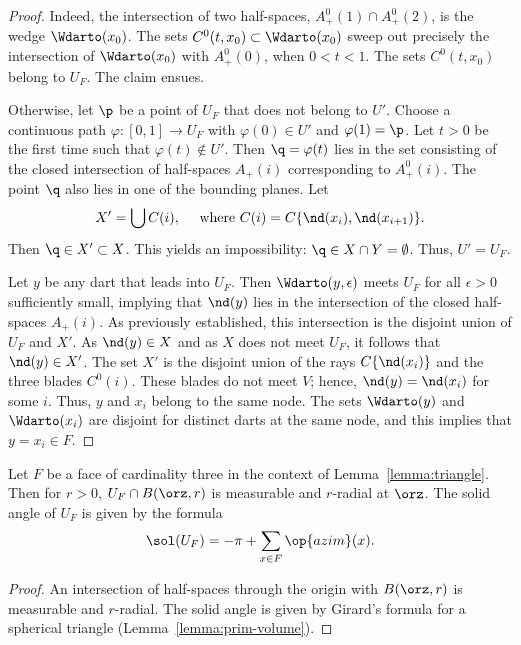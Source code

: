 \begin{proof} 
Indeed, the intersection of two half-spaces, $A^0_+(1)\cap
  A^0_+(2)$, is the wedge $\Wdarto(x_0)$.  The sets
  $C^0(t,x_0)\subset\Wdarto(x_0)$ sweep out precisely the intersection
  of $\Wdarto(x_0)$ with $A^0_+(0)$, when $0<t<1$.  The sets
  $C^0(t,x_0)$ belong to $U_F$.  The claim ensues.

   Otherwise, let
  $\p$ be a point of $U_F$ that does not belong to $U'$.  Choose a
  continuous path $\varphi:[0,1]\to U_F$ with $\varphi(0)\in U'$ and
  $\varphi(1)=\p$.  Let $t>0$ be the first time such that
  $\varphi(t)\not\in U'$.  Then $\q=\varphi(t)$ lies in the set
  consisting of the closed intersection of half-spaces $A_+(i)$
  corresponding to $A^0_+(i)$.  The point $\q$ also lies in one of the
  bounding planes.  Let
\[ 
X' = \bigcup C(i),\quad\text{ where } C(i)=C\{\nd(x_i),\nd(x_{i+1})\}.
\] 
Then $\q\in X'\subset X$.  This yields an impossibility:
$\q\in X\cap Y = \emptyset$.   Thus, $U'=U_F$.

Let $y$ be any dart that leads into $U_F$.  Then
$\Wdarto(y,\epsilon)$ meets $U_F$ for all $\epsilon>0$ sufficiently
small, implying that $\nd(y)$ lies in the intersection of the
closed half-spaces $A_+(i)$.  As previously established, this
intersection is the disjoint union of $U_F$ and $X'$.  As $\nd(y)\in
X$ and as $X$ does not meet $U_F$, it follows that $\nd(y)\in X'$.  The set
$X'$ is the disjoint union of the rays $C\{\nd(x_i)\}$ and the three
blades $C^0(i)$.  These blades do not meet $V$; hence, $\nd(y)=\nd(x_i)$
for some $i$.  Thus, $y$ and $x_i$ belong to the same node.  The sets
$\Wdarto(y)$ and $\Wdarto( x_i)$ are disjoint for distinct darts at the
same node, and this implies that $y=x_i\in F$.
\end{proof}

\begin{corollary}\label{lemma:girard-component}
Let $F$ be a face of cardinality three in the context of
Lemma~\ref{lemma:triangle}.  Then for $r>0$, $U_F \cap B(\orz,r)$ is
measurable and $r$-radial at $\orz$.  The solid angle of $U_F$ is
given by the formula
\[ 
\sol(U_F) = -\pi + \sum_{x\in F}\op{azim}(x).
\] 
\end{corollary}
%
%
%

\begin{proof} An intersection of half-spaces through the origin 
with $B(\orz,r)$ is measurable and
$r$-radial.  The solid angle is given by Girard's formula for
a spherical triangle (Lemma~\ref{lemma:prim-volume}).
\end{proof}
%

